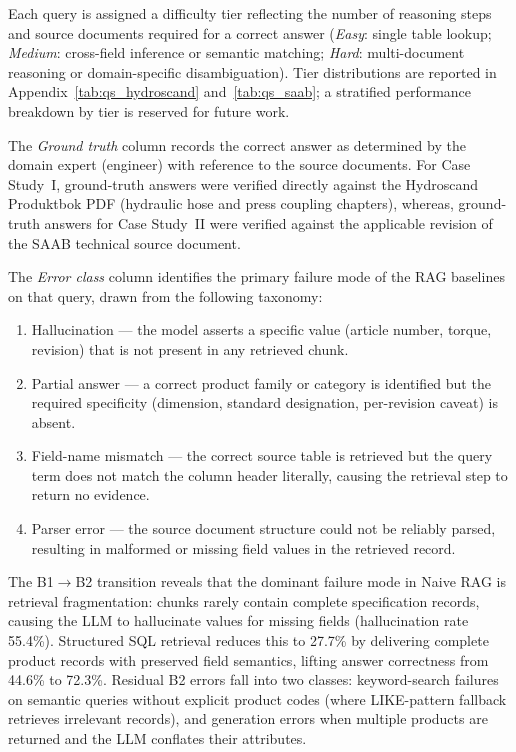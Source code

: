 \documentclass[largeformat]{interact}
\begin{document}
Each query is assigned a difficulty tier reflecting the number of reasoning steps and source documents required for a correct answer (\emph{Easy}: single table lookup; \emph{Medium}: cross-field inference or semantic matching; \emph{Hard}: multi-document reasoning or domain-specific disambiguation). Tier distributions are reported in Appendix~\ref{tab:qs_hydroscand} and~\ref{tab:qs_saab}; a stratified performance breakdown by tier is reserved for future work.

The \emph{Ground truth} column records the correct answer as determined by the domain expert (engineer) with reference to the source documents. For Case Study~I, ground-truth answers were verified directly against the Hydroscand Produktbok PDF (hydraulic hose and press coupling chapters), whereas, ground-truth answers for Case Study~II were verified against the applicable revision of the SAAB technical source document.

The \emph{Error class} column identifies the primary failure mode of the RAG baselines on that query, drawn from the following taxonomy:
\begin{enumerate}[label=\roman*.]
    \item Hallucination — the model asserts a specific value (article number, torque, revision) that is not present in any retrieved chunk.
    \item Partial answer — a correct product family or category is identified but the required specificity (dimension, standard designation, per-revision caveat) is absent.
    \item Field-name mismatch — the correct source table is retrieved but the query term does not match the column header literally, causing the retrieval step to return no evidence.
    \item Parser error — the source document structure could not be reliably parsed, resulting in malformed or missing field values in the retrieved record.
\end{enumerate}

The B1$\rightarrow$B2 transition reveals that the dominant failure mode in Naive RAG is retrieval fragmentation: chunks rarely contain complete specification records, causing the LLM to hallucinate values for missing fields (hallucination rate 55.4\%). Structured SQL retrieval reduces this to 27.7\% by delivering complete product records with preserved field semantics, lifting answer correctness from 44.6\% to 72.3\%. Residual B2 errors fall into two classes: keyword-search failures on semantic queries without explicit product codes (where LIKE-pattern fallback retrieves irrelevant records), and generation errors when multiple products are returned and the LLM conflates their attributes.
\end{document}
